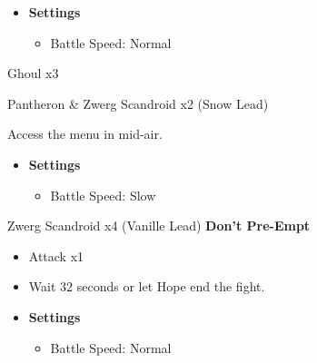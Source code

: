 \begin{paracol}{2}
	\begin{menu}
		\begin{itemize}
			\item \textbf{Settings}
			      \begin{itemize}
				      \item Battle Speed: Normal
			      \end{itemize}
		\end{itemize}
	\end{menu}

	\begin{battle}{Ghoul x3}
	\end{battle}
\switchcolumn
\begin{battle}{Pantheron \& Zwerg Scandroid x2 (Snow Lead)}
\end{battle}

Access the menu in mid-air.

\begin{menu}
\begin{itemize}
    \item \textbf{Settings}
    \begin{itemize}
        \item Battle Speed: Slow
    \end{itemize}
\end{itemize}
\end{menu}

\begin{battle}{Zwerg Scandroid x4 (Vanille Lead) \textbf{Don't Pre-Empt}}
\begin{itemize}
    \item Attack x1
    \item Wait 32 seconds or let Hope end the fight.
\end{itemize}
\end{battle}


\begin{menu}
\begin{itemize}
    \item \textbf{Settings}
    \begin{itemize}
        \item Battle Speed: Normal
    \end{itemize}
\end{itemize}
\end{menu}


\end{paracol}
